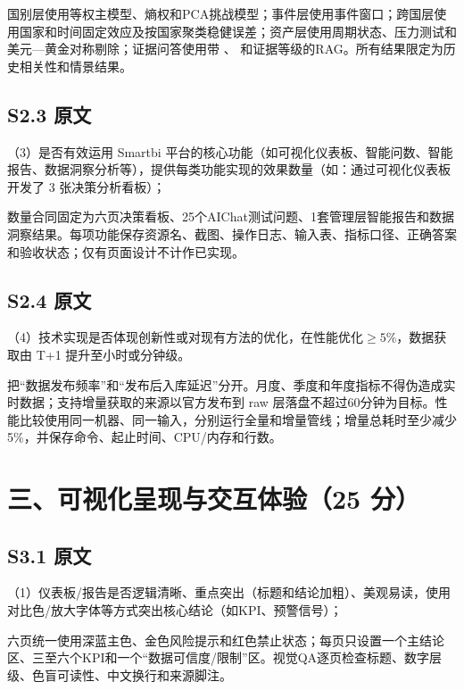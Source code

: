 \begin{decisionbox}[S2.2 怎么做]
国别层使用等权主模型、熵权和PCA挑战模型；事件层使用事件窗口；跨国层使用国家和时间固定效应及按国家聚类稳健误差；资产层使用周期状态、压力测试和美元—黄金对称剔除；证据问答使用带 、 和证据等级的RAG。所有结果限定为历史相关性和情景结果。
\end{decisionbox}

\subsection*{S2.3 原文}
（3）是否有效运用 Smartbi 平台的核心功能（如可视化仪表板、智能问数、智能报告、数据洞察分析等），提供每类功能实现的效果数量（如：通过可视化仪表板开发了 3 张决策分析看板）；

\begin{decisionbox}[S2.3 怎么做]
数量合同固定为六页决策看板、25个AIChat测试问题、1套管理层智能报告和数据洞察结果。每项功能保存资源名、截图、操作日志、输入表、指标口径、正确答案和验收状态；仅有页面设计不计作已实现。
\end{decisionbox}

\subsection*{S2.4 原文}
（4）技术实现是否体现创新性或对现有方法的优化，在性能优化$\geq 5\%$，数据获取由 T+1 提升至小时或分钟级。

\begin{decisionbox}[S2.4 怎么做]
把“数据发布频率”和“发布后入库延迟”分开。月度、季度和年度指标不得伪造成实时数据；支持增量获取的来源以官方发布到 raw 层落盘不超过60分钟为目标。性能比较使用同一机器、同一输入，分别运行全量和增量管线；增量总耗时至少减少5\%，并保存命令、起止时间、CPU/内存和行数。
\end{decisionbox}

\section{三、可视化呈现与交互体验（25 分）}

\subsection*{S3.1 原文}
（1）仪表板/报告是否逻辑清晰、重点突出（标题和结论加粗）、美观易读，使用对比色/放大字体等方式突出核心结论（如KPI、预警信号）；

\begin{decisionbox}[S3.1 怎么做]
六页统一使用深蓝主色、金色风险提示和红色禁止状态；每页只设置一个主结论区、三至六个KPI和一个“数据可信度/限制”区。视觉QA逐页检查标题、数字层级、色盲可读性、中文换行和来源脚注。
\end{decisionbox}


